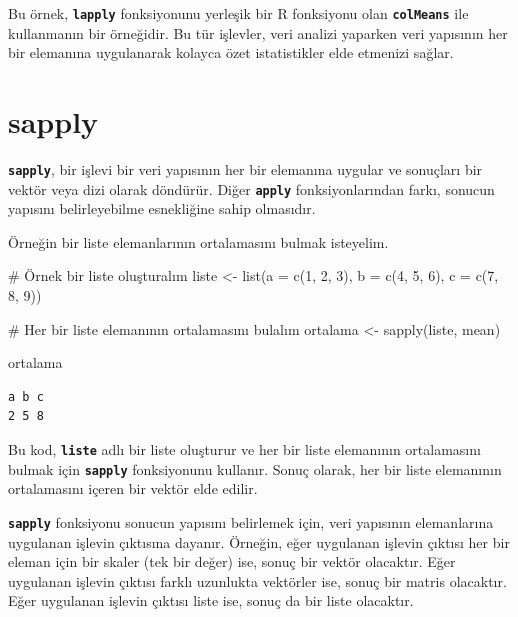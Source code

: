 \documentclass[
  letterpaper,
  DIV=11,
  numbers=noendperiod]{scrreprt}
\newenvironment{Shaded}{\begin{snugshade}}{\end{snugshade}}
\newcommand{\AttributeTok}[1]{\textcolor[rgb]{0.40,0.45,0.13}{#1}}
\newcommand{\CommentTok}[1]{\textcolor[rgb]{0.37,0.37,0.37}{#1}}
\newcommand{\DecValTok}[1]{\textcolor[rgb]{0.68,0.00,0.00}{#1}}
\newcommand{\FunctionTok}[1]{\textcolor[rgb]{0.28,0.35,0.67}{#1}}
\newcommand{\NormalTok}[1]{\textcolor[rgb]{0.00,0.23,0.31}{#1}}
\newcommand{\OtherTok}[1]{\textcolor[rgb]{0.00,0.23,0.31}{#1}}
\begin{document}
Bu örnek, \textbf{\texttt{lapply}} fonksiyonunu yerleşik bir R
fonksiyonu olan \textbf{\texttt{colMeans}} ile kullanmanın bir
örneğidir. Bu tür işlevler, veri analizi yaparken veri yapısının her bir
elemanına uygulanarak kolayca özet istatistikler elde etmenizi sağlar.

\section{sapply}\label{sapply}

\textbf{\texttt{sapply}}, bir işlevi bir veri yapısının her bir
elemanına uygular ve sonuçları bir vektör veya dizi olarak döndürür.
Diğer \textbf{\texttt{apply}} fonksiyonlarından farkı, sonucun yapısını
belirleyebilme esnekliğine sahip olmasıdır.

Örneğin bir liste elemanlarının ortalamasını bulmak isteyelim.

\begin{Shaded}
\begin{Highlighting}[]
\CommentTok{\# Örnek bir liste oluşturalım}
\NormalTok{liste }\OtherTok{\textless{}{-}} \FunctionTok{list}\NormalTok{(}\AttributeTok{a =} \FunctionTok{c}\NormalTok{(}\DecValTok{1}\NormalTok{, }\DecValTok{2}\NormalTok{, }\DecValTok{3}\NormalTok{), }\AttributeTok{b =} \FunctionTok{c}\NormalTok{(}\DecValTok{4}\NormalTok{, }\DecValTok{5}\NormalTok{, }\DecValTok{6}\NormalTok{), }\AttributeTok{c =} \FunctionTok{c}\NormalTok{(}\DecValTok{7}\NormalTok{, }\DecValTok{8}\NormalTok{, }\DecValTok{9}\NormalTok{))}

\CommentTok{\# Her bir liste elemanının ortalamasını bulalım}
\NormalTok{ortalama }\OtherTok{\textless{}{-}} \FunctionTok{sapply}\NormalTok{(liste, mean)}

\NormalTok{ortalama}
\end{Highlighting}
\end{Shaded}

\begin{verbatim}
a b c 
2 5 8 
\end{verbatim}

Bu kod, \textbf{\texttt{liste}} adlı bir liste oluşturur ve her bir
liste elemanının ortalamasını bulmak için \textbf{\texttt{sapply}}
fonksiyonunu kullanır. Sonuç olarak, her bir liste elemanının
ortalamasını içeren bir vektör elde edilir.

\textbf{\texttt{sapply}} fonksiyonu sonucun yapısını belirlemek için,
veri yapısının elemanlarına uygulanan işlevin çıktısına dayanır.
Örneğin, eğer uygulanan işlevin çıktısı her bir eleman için bir skaler
(tek bir değer) ise, sonuç bir vektör olacaktır. Eğer uygulanan işlevin
çıktısı farklı uzunlukta vektörler ise, sonuç bir matris olacaktır. Eğer
uygulanan işlevin çıktısı liste ise, sonuç da bir liste olacaktır.
\end{document}
